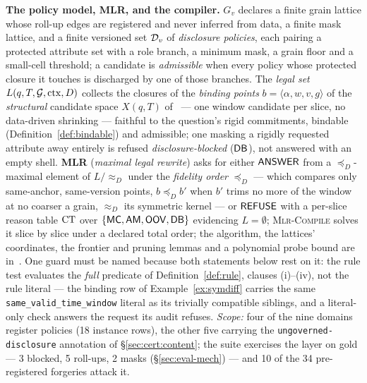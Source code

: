 \smallskip\noindent{}\textbf{The policy model, MLR, and the compiler.} $G_v$
declares a finite grain lattice whose roll-up edges are registered and never
inferred from data, a finite mask lattice, and a finite versioned set $\mathcal{D}_v$
of \emph{disclosure policies}, each pairing a protected attribute set with a
role branch, a minimum mask, a grain floor and a small-cell threshold; a
candidate is \emph{admissible} when every policy whose protected closure it
touches is discharged by one of those branches. The \emph{legal set}
$L(q,T,\mathcal{G},\mathrm{ctx},D)$ collects the closures of the \emph{binding points}
$b=\langle\alpha,w,v,g\rangle$ of the \emph{structural} candidate space
$X(q,T)$ of~\cite{asofgov-tr} --- one window candidate per slice, no
data-driven shrinking --- faithful to the question's rigid
commitments, bindable (Definition~\ref{def:bindable}) and admissible; one masking
a rigidly requested attribute away entirely is refused
\emph{disclosure-blocked} ($\mathsf{DB}$), not answered with an empty shell.
\textbf{MLR} (\emph{maximal legal rewrite}) asks for either $\mathsf{ANSWER}$ from a
$\preceq_D$-maximal element of
$L/\!\approx_D$ under the \emph{fidelity order} $\preceq_D$ --- which compares
only same-anchor, same-version points, $b\preceq_D b'$ when $b'$ trims no more
of the window at no coarser a grain, $\approx_D$ its symmetric kernel ---
or $\mathsf{REFUSE}$ with a
per-slice reason table $\mathrm{CT}$ over $\{\mathsf{MC},\mathsf{AM},\mathsf{OOV},\mathsf{DB}\}$ evidencing
$L=\emptyset$; \textsc{Mlr-Compile} solves it slice by slice under a declared
total order; the algorithm, the lattices' coordinates, the frontier and
pruning lemmas and a polynomial probe bound are in~\cite{asofgov-tr}. One guard
must be named because both statements below rest on it: the rule test
evaluates the \emph{full} predicate of Definition~\ref{def:rule}, clauses
(i)--(iv), not the rule literal --- the binding row of
Example~\ref{ex:symdiff} carries the same
\texttt{same\_\allowbreak valid\_\allowbreak time\_\allowbreak window} literal
as its trivially compatible siblings, and a literal-only check answers the
request its audit refuses.
\emph{Scope:} four of the nine domains register policies (18 instance rows),
the other five carrying the
\texttt{ungoverned-disclosure} annotation of \S\ref{sec:cert:content}; the
suite exercises the layer on gold --- 3 blocked, 5 roll-ups, 2 masks
(\S\ref{sec:eval-mech}) --- and 10 of the 34 pre-registered forgeries
attack it.

